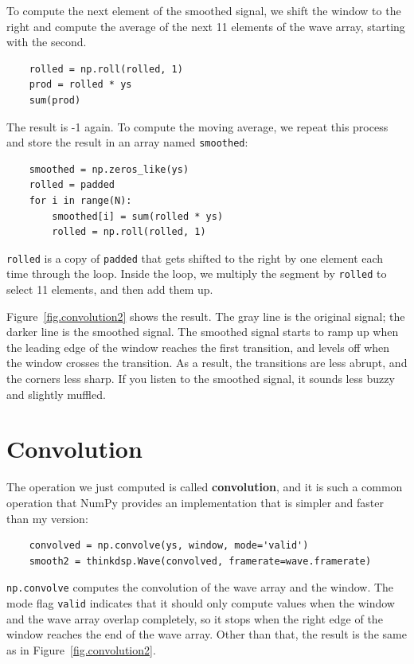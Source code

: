 \documentclass[12pt]{book}
\begin{document}
To compute the next element of the smoothed signal, we shift the
window to the right and compute the average of the next 11 elements of
the wave array, starting with the second.

\begin{verbatim}
    rolled = np.roll(rolled, 1)
    prod = rolled * ys
    sum(prod)
\end{verbatim}

The result is -1 again.
To compute the moving average, we repeat this process and store
the result in an array named {\tt smoothed}:

\begin{verbatim}
    smoothed = np.zeros_like(ys)
    rolled = padded
    for i in range(N):
        smoothed[i] = sum(rolled * ys)
        rolled = np.roll(rolled, 1)
\end{verbatim}

{\tt rolled} is a copy of {\tt padded} that gets shifted to
the right by one element each time through the loop.  Inside
the loop, we multiply the segment by {\tt rolled} to select
11 elements, and then add them up.

Figure~\ref{fig.convolution2} shows the result.  The gray line
is the original signal; the darker line is the smoothed signal.
The smoothed signal starts to ramp up when the leading edge of
the window reaches the first transition, and levels off when
the window crosses the transition.  As a result, the transitions
are less abrupt, and the corners less sharp.  If you listen
to the smoothed signal, it sounds less buzzy and slightly muffled.


\section{Convolution}
\label{convolution}

The operation we just computed is called {\bf convolution},
and it is such a common operation that NumPy provides an
implementation that is simpler and faster than my version:

\begin{verbatim}
    convolved = np.convolve(ys, window, mode='valid')
    smooth2 = thinkdsp.Wave(convolved, framerate=wave.framerate)
\end{verbatim}

{\tt np.convolve} computes the convolution of the wave
array and the window.  The mode flag {\tt valid} indicates
that it should only compute values when the window and the
wave array overlap completely, so it stops when the right
edge of the window reaches the end of the wave array.  Other
than that, the result is the same as in Figure~\ref{fig.convolution2}.
\end{document}
